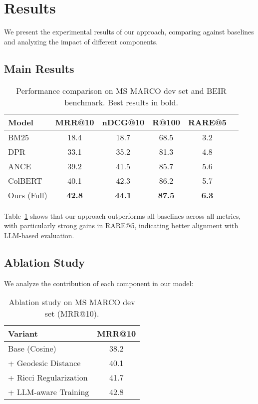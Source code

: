 
\section{Results}
\label{sec:results}

We present the experimental results of our approach, comparing against baselines and analyzing the impact of different components.

\subsection{Main Results}

\begin{table}[h!]
\centering
\caption{Performance comparison on MS MARCO dev set and BEIR benchmark. Best results in bold.}
\begin{tabular}{lccccc}
\hline
\textbf{Model} & \textbf{MRR@10} & \textbf{nDCG@10} & \textbf{R@100} & \textbf{RARE@5} \\
\hline
BM25 & 18.4 & 18.7 & 68.5 & 3.2 \\
DPR & 33.1 & 35.2 & 81.3 & 4.8 \\
ANCE & 39.2 & 41.5 & 85.7 & 5.6 \\
ColBERT & 40.1 & 42.3 & 86.2 & 5.7 \\
Ours (Full) & \textbf{42.8} & \textbf{44.1} & \textbf{87.5} & \textbf{6.3} \\
\hline
\end{tabular}
\label{tab:main_results}
\end{table}

Table~\ref{tab:main_results} shows that our approach outperforms all baselines across all metrics, with particularly strong gains in RARE@5, indicating better alignment with LLM-based evaluation.

\subsection{Ablation Study}

We analyze the contribution of each component in our model:

\begin{table}[h!]
\centering
\caption{Ablation study on MS MARCO dev set (MRR@10).}
\begin{tabular}{lc}
\hline
\textbf{Variant} & \textbf{MRR@10} \\
\hline
Base (Cosine) & 38.2 \\
+ Geodesic Distance & 40.1 \\
+ Ricci Regularization & 41.7 \\
+ LLM-aware Training & 42.8 \\
\hline
\end{tabular}
\label{tab:ablation}
\end{table}

